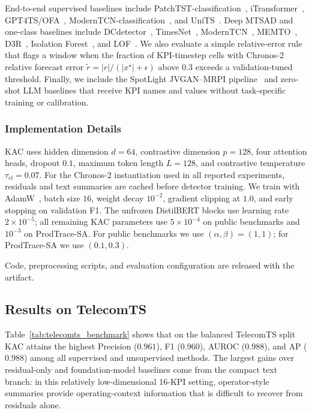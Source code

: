 \documentclass[conference]{IEEEtran}
\begin{document}
End-to-end supervised baselines include PatchTST-classification~\cite{nie2023patchtst}, iTransformer~\cite{liu2024itransformer}, GPT4TS/OFA~\cite{zhou2023gpt4ts}, ModernTCN-classification~\cite{luo2024moderntcn}, and UniTS~\cite{gao2024units}. Deep MTSAD and one-class baselines include DCdetector~\cite{yang2023dcdetector}, TimesNet~\cite{wu2023timesnet}, ModernTCN~\cite{luo2024moderntcn}, MEMTO~\cite{song2023memto}, D3R~\cite{wang2023d3r}, Isolation Forest~\cite{liu2008isolation}, and LOF~\cite{breunig2000lof}. We also evaluate a simple relative-error rule that flags a window when the fraction of KPI-timestep cells with Chronos-2 relative forecast error $\tilde{r}=|r|/(|x^\star|+\epsilon)$ above $0.3$ exceeds a validation-tuned threshold. Finally, we include the SpotLight JVGAN--MRPI pipeline~\cite{sun2024spotlight} and zero-shot LLM baselines that receive KPI names and values without task-specific training or calibration.

\subsubsection{Implementation Details}
\label{sec:impl}

KAC uses hidden dimension $d=64$, contrastive dimension $p=128$, four attention heads, dropout $0.1$, maximum token length $L=128$, and contrastive temperature $\tau_{\mathrm{cl}}=0.07$. For the Chronos-2 instantiation used in all reported experiments, residuals and text summaries are cached before detector training. We train with AdamW~\cite{loshchilov2019adamw}, batch size $16$, weight decay $10^{-2}$, gradient clipping at $1.0$, and early stopping on validation F1. The unfrozen DistilBERT blocks use learning rate $2{\times}10^{-5}$; all remaining KAC parameters use $5{\times}10^{-4}$ on public benchmarks and $10^{-3}$ on ProdTrace-SA. For public benchmarks we use $(\alpha,\beta)=(1,1)$; for ProdTrace-SA we use $(0.1,0.3)$.

Code, preprocessing scripts, and evaluation configuration are released with the artifact.

\subsection{Results on TelecomTS}
\label{sec:res_telecomts}

Table~\ref{tab:telecomts_benchmark} shows that on the balanced TelecomTS split KAC attains the highest Precision ($0.961$), F1 ($0.960$), AUROC ($0.988$), and AP ($0.988$) among all supervised and unsupervised methods. The largest gains over residual-only and foundation-model baselines come from the compact text branch: in this relatively low-dimensional 16-KPI setting, operator-style summaries provide operating-context information that is difficult to recover from residuals alone.
\end{document}
